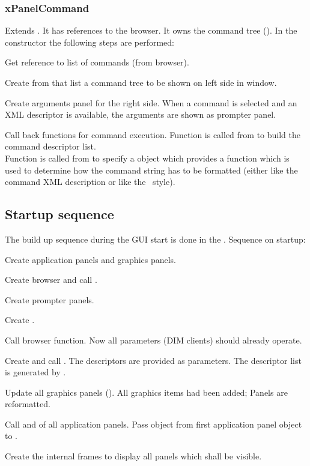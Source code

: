 \subsubsection{xPanelCommand}
Extends .
It has references to the browser. It owns the command tree (). In the constructor
the following steps are performed:
\bnum
\item Get reference to list of commands (from browser).
\item Create from that list a command tree to be shown on left side in window.
\item Create arguments panel for the right side. When a command is selected and
an XML descriptor is available, the arguments are shown as prompter panel.
\item Call back functions for command execution.
\enum
Function  is called from  to build
the command descriptor list.\\
Function  is called from  to specify
a  object which provides a function 
which is used to determine how the command string has to be formatted (either
like the command XML description or like the \mbs\ style).
\subsection{Startup sequence}
The build up sequence during the GUI start 
is done in the .
Sequence on startup:
\bnum
\item Create application panels and graphics panels.
\item Create browser and call .
\item Create prompter panels.
\item Create .
\item Call browser  function. 
Now all parameters (DIM clients) should already operate.
\item Create  and call .
The descriptors are provided as parameters. The descriptor list is
generated by .
\item Update all graphics panels (). All graphics items had been added;
Panels are reformatted.
\item Call  and  of all application panels. Pass
 object from first application panel object to .
\item Create the internal frames to display all panels which shall be visible.
\enum 
